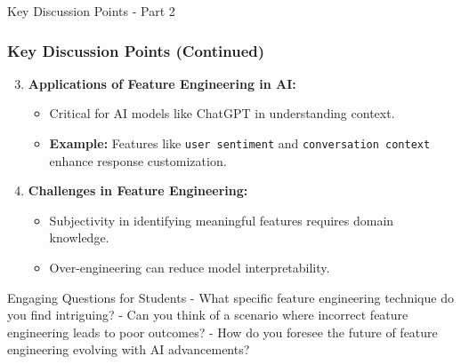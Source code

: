 \documentclass[aspectratio=169]{beamer}
\begin{document}
\begin{frame}[fragile]{Key Discussion Points - Part 2}
    \frametitle{Key Discussion Points (Continued)}
    \begin{enumerate}
        \setcounter{enumi}{2}
        \item \textbf{Applications of Feature Engineering in AI:}
        \begin{itemize}
            \item Critical for AI models like ChatGPT in understanding context.
            \item \textbf{Example:} Features like \texttt{user sentiment} and \texttt{conversation context} enhance response customization.
        \end{itemize}

        \item \textbf{Challenges in Feature Engineering:}
        \begin{itemize}
            \item Subjectivity in identifying meaningful features requires domain knowledge.
            \item Over-engineering can reduce model interpretability.
        \end{itemize}
    \end{enumerate}
    
    \begin{block}{Engaging Questions for Students}
        - What specific feature engineering technique do you find intriguing?
        - Can you think of a scenario where incorrect feature engineering leads to poor outcomes?
        - How do you foresee the future of feature engineering evolving with AI advancements?
    \end{block}
\end{frame}
\end{document}
